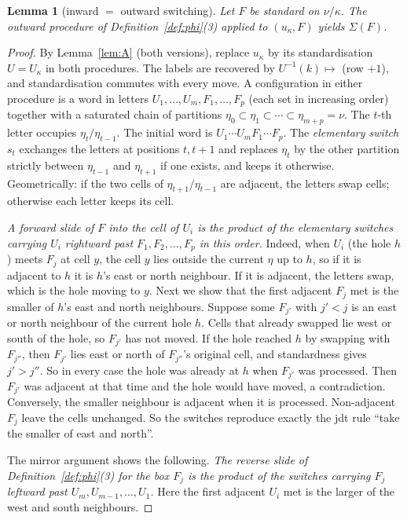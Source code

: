 \documentclass[11pt]{article}
\newtheorem{lemma}[theorem]{Lemma}
\theoremstyle{definition}
\begin{document}
\begin{lemma}[inward $=$ outward switching]\label{lem:D}
Let $F$ be standard on $\nu/\kappa$. The outward procedure of Definition~\ref{def:phi}(3) applied to $(u_\kappa,F)$ yields
$\Sigma(F)$.
\end{lemma}
\begin{proof}
By Lemma~\ref{lem:A} (both versions), replace $u_\kappa$ by its standardisation $U=U_\kappa$ in both procedures. The labels
are recovered by $U^{-1}(k)\mapsto$ (row $+1$), and standardisation commutes with every move. A configuration in either
procedure is a word in letters $U_1,\dots,U_m,F_1,\dots,F_p$ (each set in increasing order) together with a saturated chain of
partitions $\eta_0\subset\eta_1\subset\cdots\subset\eta_{m+p}=\nu$. The $t$-th letter occupies $\eta_t/\eta_{t-1}$. The initial
word is $U_1\cdots U_mF_1\cdots F_p$. The \emph{elementary switch} $s_t$ exchanges the letters at positions $t,t+1$ and replaces
$\eta_t$ by the other partition strictly between $\eta_{t-1}$ and $\eta_{t+1}$ if one exists, and keeps it otherwise. Geometrically:
if the two cells of $\eta_{t+1}/\eta_{t-1}$ are adjacent, the letters swap cells; otherwise each letter keeps its cell.

\emph{A forward slide of $F$ into the cell of $U_i$ is the product of the elementary switches carrying $U_i$ rightward past
$F_1,F_2,\dots,F_p$ in this order.} Indeed, when $U_i$ (the hole $h$) meets $F_j$ at cell $y$, the cell $y$ lies outside the
current $\eta$ up to $h$, so if it is adjacent to $h$ it is $h$'s east or north neighbour. If it is adjacent, the letters swap,
which is the hole moving to $y$. Next we show that the first adjacent $F_j$ met is the smaller of $h$'s east and north
neighbours. Suppose some $F_{j'}$ with $j'<j$ is an east or north neighbour of the current hole $h$. Cells that already
swapped lie west or south of the hole, so $F_{j'}$ has not moved. If the hole reached $h$ by swapping with $F_{j''}$, then
$F_{j'}$ lies east or north of $F_{j''}$'s original cell, and standardness gives $j'>j''$. So in every case the hole was
already at $h$ when $F_{j'}$ was processed. Then $F_{j'}$ was adjacent at that time and the hole would have moved, a
contradiction.
Conversely, the smaller neighbour is adjacent when it is processed. Non-adjacent $F_j$ leave the cells unchanged. So the
switches reproduce exactly the jdt rule ``take the smaller of east and north''.

The mirror argument shows the following. \emph{The reverse slide of Definition~\ref{def:phi}(3) for the box $F_j$ is the product
of the switches carrying $F_j$ leftward past $U_m,U_{m-1},\dots,U_1$.} Here the first adjacent $U_i$ met is the larger of
the west and south neighbours.


\end{proof}
\end{document}
